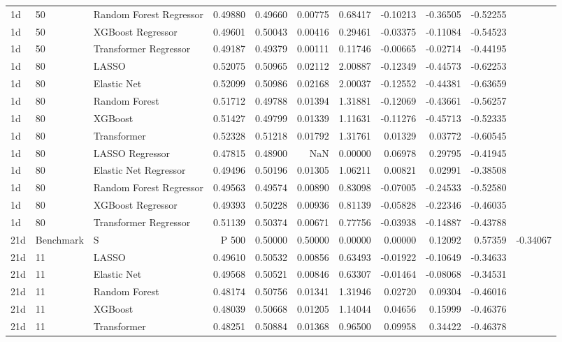 \begin{tabular}{lllrrrrrrr}
1d & 50 & Random Forest Regressor & 0.49880 & 0.49660 & 0.00775 & 0.68417 & -0.10213 & -0.36505 & -0.52255 \\
1d & 50 & XGBoost Regressor & 0.49601 & 0.50043 & 0.00416 & 0.29461 & -0.03375 & -0.11084 & -0.54523 \\
1d & 50 & Transformer Regressor & 0.49187 & 0.49379 & 0.00111 & 0.11746 & -0.00665 & -0.02714 & -0.44195 \\
1d & 80 & LASSO & 0.52075 & 0.50965 & 0.02112 & 2.00887 & -0.12349 & -0.44573 & -0.62253 \\
1d & 80 & Elastic Net & 0.52099 & 0.50986 & 0.02168 & 2.00037 & -0.12552 & -0.44381 & -0.63659 \\
1d & 80 & Random Forest & 0.51712 & 0.49788 & 0.01394 & 1.31881 & -0.12069 & -0.43661 & -0.56257 \\
1d & 80 & XGBoost & 0.51427 & 0.49799 & 0.01339 & 1.11631 & -0.11276 & -0.45713 & -0.52335 \\
1d & 80 & Transformer & 0.52328 & 0.51218 & 0.01792 & 1.31761 & 0.01329 & 0.03772 & -0.60545 \\
1d & 80 & LASSO Regressor & 0.47815 & 0.48900 & NaN & 0.00000 & 0.06978 & 0.29795 & -0.41945 \\
1d & 80 & Elastic Net Regressor & 0.49496 & 0.50196 & 0.01305 & 1.06211 & 0.00821 & 0.02991 & -0.38508 \\
1d & 80 & Random Forest Regressor & 0.49563 & 0.49574 & 0.00890 & 0.83098 & -0.07005 & -0.24533 & -0.52580 \\
1d & 80 & XGBoost Regressor & 0.49393 & 0.50228 & 0.00936 & 0.81139 & -0.05828 & -0.22346 & -0.46035 \\
1d & 80 & Transformer Regressor & 0.51139 & 0.50374 & 0.00671 & 0.77756 & -0.03938 & -0.14887 & -0.43788 \\
21d & Benchmark & S&P 500 & 0.50000 & 0.50000 & 0.00000 & 0.00000 & 0.12092 & 0.57359 & -0.34067 \\
21d & 11 & LASSO & 0.49610 & 0.50532 & 0.00856 & 0.63493 & -0.01922 & -0.10649 & -0.34633 \\
21d & 11 & Elastic Net & 0.49568 & 0.50521 & 0.00846 & 0.63307 & -0.01464 & -0.08068 & -0.34531 \\
21d & 11 & Random Forest & 0.48174 & 0.50756 & 0.01341 & 1.31946 & 0.02720 & 0.09304 & -0.46016 \\
21d & 11 & XGBoost & 0.48039 & 0.50668 & 0.01205 & 1.14044 & 0.04656 & 0.15999 & -0.46376 \\
21d & 11 & Transformer & 0.48251 & 0.50884 & 0.01368 & 0.96500 & 0.09958 & 0.34422 & -0.46378 \\

\end{tabular}

